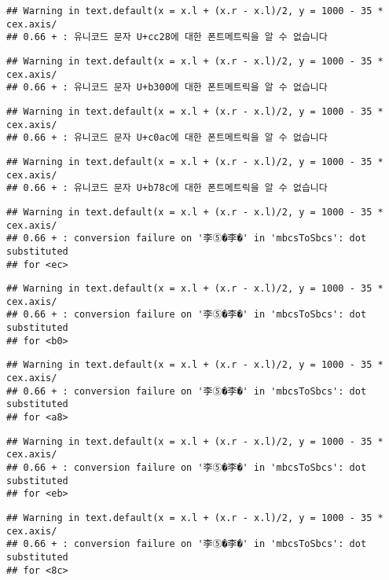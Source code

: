 \documentclass[]{article}
\begin{document}
\begin{verbatim}
## Warning in text.default(x = x.l + (x.r - x.l)/2, y = 1000 - 35 * cex.axis/
## 0.66 + : 유니코드 문자 U+cc28에 대한 폰트메트릭을 알 수 없습니다
\end{verbatim}

\begin{verbatim}
## Warning in text.default(x = x.l + (x.r - x.l)/2, y = 1000 - 35 * cex.axis/
## 0.66 + : 유니코드 문자 U+b300에 대한 폰트메트릭을 알 수 없습니다
\end{verbatim}

\begin{verbatim}
## Warning in text.default(x = x.l + (x.r - x.l)/2, y = 1000 - 35 * cex.axis/
## 0.66 + : 유니코드 문자 U+c0ac에 대한 폰트메트릭을 알 수 없습니다
\end{verbatim}

\begin{verbatim}
## Warning in text.default(x = x.l + (x.r - x.l)/2, y = 1000 - 35 * cex.axis/
## 0.66 + : 유니코드 문자 U+b78c에 대한 폰트메트릭을 알 수 없습니다
\end{verbatim}

\begin{verbatim}
## Warning in text.default(x = x.l + (x.r - x.l)/2, y = 1000 - 35 * cex.axis/
## 0.66 + : conversion failure on '李⑤�李�' in 'mbcsToSbcs': dot substituted
## for <ec>
\end{verbatim}

\begin{verbatim}
## Warning in text.default(x = x.l + (x.r - x.l)/2, y = 1000 - 35 * cex.axis/
## 0.66 + : conversion failure on '李⑤�李�' in 'mbcsToSbcs': dot substituted
## for <b0>
\end{verbatim}

\begin{verbatim}
## Warning in text.default(x = x.l + (x.r - x.l)/2, y = 1000 - 35 * cex.axis/
## 0.66 + : conversion failure on '李⑤�李�' in 'mbcsToSbcs': dot substituted
## for <a8>
\end{verbatim}

\begin{verbatim}
## Warning in text.default(x = x.l + (x.r - x.l)/2, y = 1000 - 35 * cex.axis/
## 0.66 + : conversion failure on '李⑤�李�' in 'mbcsToSbcs': dot substituted
## for <eb>
\end{verbatim}

\begin{verbatim}
## Warning in text.default(x = x.l + (x.r - x.l)/2, y = 1000 - 35 * cex.axis/
## 0.66 + : conversion failure on '李⑤�李�' in 'mbcsToSbcs': dot substituted
## for <8c>
\end{verbatim}
\end{document}
